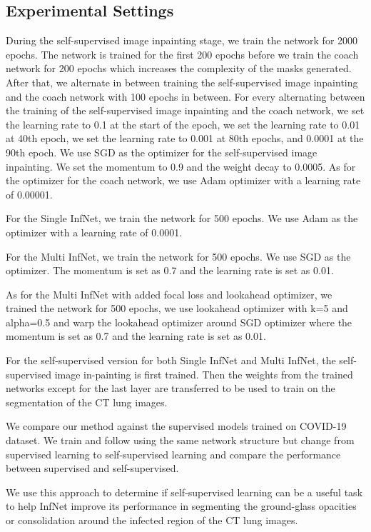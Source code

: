 \subsection{Experimental Settings}
During the self-supervised image inpainting stage, we train the network for 2000 epochs. The network is trained for the first 200 epochs before we train the coach network for 200 epochs which increases the complexity of the masks generated. After that, we alternate in between training the self-supervised image inpainting and the coach network with 100 epochs in between. For every alternating between the training of the self-supervised image inpainting and the coach network, we set the learning rate to 0.1 at the start of the epoch, we set the learning rate to 0.01 at 40th epoch, we set the learning rate to 0.001 at 80th epochs, and 0.0001 at the 90th epoch.  We use SGD as the optimizer for the self-supervised image inpainting.  We set the momentum to 0.9 and the weight decay to 0.0005. As for the optimizer for the coach network, we use Adam optimizer with a learning rate of 0.00001.

For the Single InfNet, we train the network for 500 epochs. We use Adam as the optimizer with a learning rate of 0.0001. 

For the Multi InfNet, we train the network for 500 epochs. We use SGD as the optimizer. The momentum is set as 0.7 and the learning rate is set as 0.01.

As for the Multi InfNet with added focal loss and lookahead optimizer, we trained the network for 500 epochs, we use lookahead optimizer with k=5 and alpha=0.5 and warp the lookahead optimizer around SGD optimizer where the momentum is set as 0.7 and the learning rate is set as 0.01.

For the self-supervised version for both Single InfNet and Multi InfNet, the self-supervised image in-painting is first trained. Then the weights from the trained networks except for the last layer are transferred to be used to train on the segmentation of the CT lung images.

We compare our method against the supervised %
\cite {ref14} models trained on COVID-19 dataset. We train and follow using the same network structure but change from supervised learning to self-supervised learning and compare the performance between supervised and self-supervised.

We use this approach to determine if self-supervised learning can be a useful task to help InfNet improve its performance in segmenting the ground-glass opacities or consolidation around the infected region of the CT lung images.

